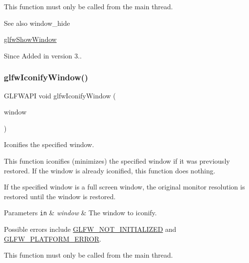 This function must only be called from the main thread.

\begin{DoxySeeAlso}{See also}
window\+\_\+hide 

\hyperlink{group__window_ga7945bcdff9e5e058cf36505d6873ed8c}{glfw\+Show\+Window}
\end{DoxySeeAlso}
\begin{DoxySince}{Since}
Added in version 3.. 
\end{DoxySince}
\mbox{\label{group__window_ga24274e3c6ecd44e11fec5e6b66e4d7f3}} 
\subsubsection{\texorpdfstring{glfw\+Iconify\+Window()}{glfwIconifyWindow()}}
{\footnotesize\ttfamily G\+L\+F\+W\+A\+PI void glfw\+Iconify\+Window (\begin{DoxyParamCaption}\item[{\hyperlink{group__window_ga3c96d80d363e67d13a41b5d1821f3242}{G\+L\+F\+Wwindow} $\ast$}]{window }\end{DoxyParamCaption})}



Iconifies the specified window. 

This function iconifies (minimizes) the specified window if it was previously restored. If the window is already iconified, this function does nothing.

If the specified window is a full screen window, the original monitor resolution is restored until the window is restored.


\begin{DoxyParams}[1]{Parameters}
\mbox{\tt in}  & {\em window} & The window to iconify.\\
\hline
\end{DoxyParams}
Possible errors include \hyperlink{group__errors_ga2374ee02c177f12e1fa76ff3ed15e14a}{G\+L\+F\+W\+\_\+\+N\+O\+T\+\_\+\+I\+N\+I\+T\+I\+A\+L\+I\+Z\+ED} and \hyperlink{group__errors_gad44162d78100ea5e87cdd38426b8c7a1}{G\+L\+F\+W\+\_\+\+P\+L\+A\+T\+F\+O\+R\+M\+\_\+\+E\+R\+R\+OR}.

This function must only be called from the main thread.

